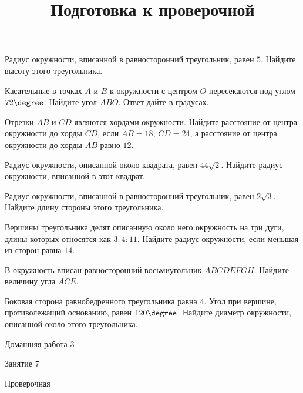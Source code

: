 \begin{class}[number=6]
\begin{listofex}
		\item Радиус окружности, вписанной в равносторонний треугольник, равен \( 5 \). Найдите высоту этого треугольника.
		\item Касательные в точках \( A \) и \( B \) к окружности с центром \( O \) пересекаются под углом \( 72\degree \). Найдите угол \( ABO \). Ответ дайте в градусах.
		\item Отрезки \( AB \) и \( CD \) являются хордами окружности. Найдите расстояние от центра окружности до хорды \( CD \), если \( AB=18 \), \( CD=24 \), а расстояние от центра окружности до хорды \( AB \) равно \( 12 \).
		\item Радиус окружности, описанной около квадрата, равен \( 44\sqrt{2} \). Найдите радиус окружности, вписанной в этот квадрат.
		\item Радиус окружности, вписанной в равносторонний треугольник, равен \( 2\sqrt{3} \). Найдите длину стороны этого треугольника.
		\item Вершины треугольника делят описанную около него окружность на три дуги, длины которых относятся как \( 3:4:11 \). Найдите радиус окружности, если меньшая из сторон равна \( 14 \).
		\item В окружность вписан равносторонний восьмиугольник \( ABCDEFGH \). Найдите величину угла \( ACE \).
		\item Боковая сторона равнобедренного треугольника равна \( 4 \). Угол при вершине, противолежащий основанию, равен \( 120\degree \). Найдите диаметр окружности, описанной около этого треугольника.
	\end{listofex}
\end{class}

\begin{homework}[number=3]
	\begin{listofex}
		\item Домашняя работа 3
	\end{listofex}
\end{homework}

\begin{class}[number=7]
	\title{Подготовка к проверочной}
	\begin{listofex}
		\item Занятие 7
	\end{listofex}
\end{class}

\begin{exam}
	\begin{listofex}
		\item Проверочная
	\end{listofex}
\end{exam}
